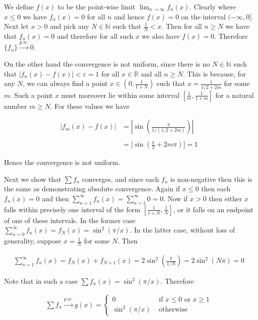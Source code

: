 \documentclass{article}
\begin{document}
  \vspace{1cm}

  We define $f(x)$ to be the point-wise limit $\displaystyle\lim_{n\to \infty}f_n(x)$.  Clearly where $x\le 0$ we have $f_n(x)=0$ for all $n$ and hence $f(x)=0$ on the interval $(-\infty,0]$.  Next let $x>0$ and pick any $N\in\mathbb N$ such that $\frac 1 N < x$.  Then for all $n\geq N$ we have that $f_n(x)=0$ and therefore for all such $x$ we also have $f(x)=0$.  Therefore $\{f_n\}\xrightarrow{p.w.} 0$.

  On the other hand the convergence is not uniform, since there is no $N\in\mathbb N$ such that $|f_n(x)-f(x)|<\varepsilon=1$ for all $x\in \mathbb R$ and all $n\geq N$.  This is because, for any $N$, we can always find a point $x\in(0,\frac{1}{1+N})$ such that $x=\frac{1}{1/2+2m}$ for some $m$.  Such a point $x$ must moreover lie within some interval $\left[\frac{1}{m},\frac{1}{1+m}\right]$ for a natural number $m\geq N$.  For these values we have 

  \begin{align*}
    |f_m(x)-f(x)|&=\left|\sin\left(\frac{\pi}{1/(1/2+2m)}\right)\right| \\\\
    &= \left| \sin\left(\frac \pi 2 +2m\pi\right)\right| = 1
  \end{align*}

  Hence the convergence is not uniform.  

  Next we show that $\sum f_n$ converges, and since each $f_n$ is non-negative then this is the same as demonstrating absolute convergence.  Again if $x \leq 0$ then each $f_n(x)=0$ and then $\sum_{n=1}^\infty f_n(x)=\sum_{n=1}^\infty 0 = 0.$  Now if $x>0$ then either $x$ falls within precisely one interval of the form $\left[ \frac{1}{1+N}, \frac 1 N \right]$, or it falls on an endpoint of one of these intervals.  In the former case $\sum_{n=0}^\infty f_n(x) = f_N(x) = \sin^2(\pi/x)$.  In the latter case, without loss of generality, suppose $x=\frac 1 N$ for some $N$.  Then 
  
  \begin{align*}
    \sum_{n=1}^\infty f_n(x) = f_N(x)+f_{N+1}(x) = 2\sin^2\left(\frac{\pi}{1/N}\right) = 2\sin^2(N\pi) = 0
  \end{align*}
  
  Note that in such a case $\sum f_n(x) = \sin^2(\pi/x)$.  Therefore 

  \begin{align*}
    \sum f_n \xrightarrow{p.w.} g(x) = \begin{cases}
      0 & \text{ if } x \le 0 \text{ or } x \ge 1 \\
      \sin^2(\pi/x) & \text{ otherwise }
    \end{cases}
  \end{align*}
\end{document}
